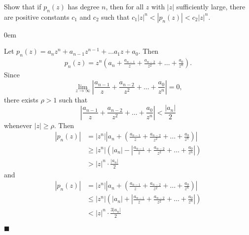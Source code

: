 \documentclass[12pt]{article}
\author{Warren Atkison}
\date{\today}
\renewcommand{\qed}{\hfill$\blacksquare$}
\renewenvironment{proof}{\vspace{1em}\begin{addmargin}[2em]{0em}\begin{newproof}}{\end{newproof}\end{addmargin}\qed}
\newenvironment{exercise}[2][Exercise]{\begin{trivlist}
\item[\hskip \labelsep {\bfseries #1} \hskip \labelsep {\bfseries #2.}]}{\end{trivlist}}
\begin{document}
\fancyhf{}
\fancyhead[R]{\today}
\fancyfoot[R]{\thepage}

\begin{exercise}{10}
	Show that if $p_n(z)$ has degree $n$, then for all $z$ with $|z|$ sufficiently large, there are positive constants $c_1$ and $c_2$ such that $c_1|z|^n < |p_n(z)| < c_2|z|^n$.
\end{exercise}
\begin{proof}
	Let $p_n(z) = a_nz^n + a_{n-1}z^{n-1} + \ldots a_1z + a_0$. Then 
	\begin{align*}
		p_n(z) = z^n(a_n + \frac{a_{n-1}}{z} + \frac{a_{n-2}}{z^2} + \ldots + \frac{a_0}{z^n}).	
	\end{align*}
	Since
	\[
		\lim_{z \to \infty} \left|\frac{a_{n-1}}{z} + \frac{a_{n-2}}{z^2} + \ldots + \frac{a_0}{z^n}\right| = 0,
	\]
	there exists $\rho>1$ such that
	\[
		\left|\frac{a_{n-1}}{z} + \frac{a_{n-2}}{z^2} + \ldots + \frac{a_0}{z^n}\right| < \frac{|a_n|}{2}
	\]
	whenever $|z| \ge \rho$. Then
	\begin{align*}
		|p_n(z)| &= |z^n|\left|a_n + \left(\frac{a_{n-1}}{z} + \frac{a_{n-2}}{z^2} + \ldots + \frac{a_0}{z^n}\right)\right| \\
			 &\ge |z^n|\left(|a_n| - \left|\frac{a_{n-1}}{z} + \frac{a_{n-2}}{z^2} + \ldots + \frac{a_0}{z^n}\right| \right) \\
			 &> |z|^n \cdot \frac{|a_n|}{2}
	\end{align*}
	and
	\begin{align*}
		|p_n(z)| &= |z^n|\left|a_n + \left(\frac{a_{n-1}}{z} + \frac{a_{n-2}}{z^2} + \ldots + \frac{a_0}{z^n}\right)\right| \\
			 &\le |z^n|\left(|a_n| + \left|\frac{a_{n-1}}{z} + \frac{a_{n-2}}{z^2} + \ldots + \frac{a_0}{z^n}\right| \right) \\
			 &< |z|^n \cdot \frac{3|a_n|}{2}	
	\end{align*}
\end{proof}
\end{document}
